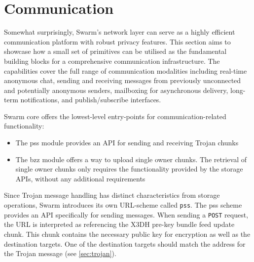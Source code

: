 \section{Communication \statusred}\label{sec:messaging}


Somewhat surprisingly, Swarm's network layer can serve as  a highly efficient  communication platform with robust privacy features. This section aims to showcase how a small set of primitives can be utilised as the fundamental building blocks for a comprehensive communication infrastructure. The capabilities cover the full range of communication modalities including real-time anonymous chat, sending and receiving messages from previously unconnected and potentially anonymous senders, mailboxing for asynchronous delivery, long-term notifications, and  publish/subscribe interfaces. 

Swarm core offers the lowest-level entry-points for communication-related functionality:

\begin{itemize}[noitemsep]
    \item The pss module provides an API for sending and receiving Trojan chunks
    \item The bzz module offers a way to upload single owner chunks. The retrieval of single owner chunks only requires the functionality provided by the storage APIs, without any additional requirements
\end{itemize}







Since Trojan message handling has distinct characteristics from storage operations, Swarm introduces its own URL-scheme called \lstinline{pss}. The pss scheme provides an API specifically for sending messages. When sending a \lstinline{POST} request, the URL is interpreted as referencing the X3DH pre-key bundle feed update chunk. This chunk contains the necessary public key for encryption as well as the destination targets.    One of the destination targets should match the address for the Trojan message (see \ref{sec:trojan}). 

